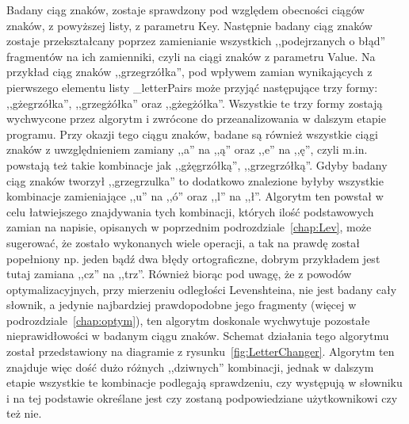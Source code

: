 \lssetdef


Badany ciąg znaków, zostaje sprawdzony pod względem obecności ciągów znaków, z powyższej listy, z parametru Key. Następnie badany ciąg znaków zostaje przekształcany poprzez zamienianie wszystkich ,,podejrzanych o błąd'' fragmentów na ich zamienniki, czyli na ciągi znaków z parametru Value. Na przykład ciąg znaków ,,grzegrzółka'', pod wpływem zamian wynikających z pierwszego elementu listy \_letterPairs może przyjąć następujące trzy formy: ,,gżegrzółka'', ,,grzegżółka'' oraz ,,gżegżółka''. Wszystkie te trzy formy zostają wychwycone przez algorytm i zwrócone do przeanalizowania w dalszym etapie programu. Przy okazji tego ciągu znaków, badane są również wszystkie ciągi znaków z uwzględnieniem zamiany ,,a'' na ,,ą'' oraz ,,e'' na ,,ę'', czyli m.in. powstają też takie kombinacje jak ,,gżęgrzółką'', ,,grzegrzółką''.  Gdyby badany ciąg znaków tworzył ,,grzegrzulka'' to dodatkowo znalezione byłyby wszystkie kombinacje zamieniające ,,u'' na ,,ó'' oraz ,,l'' na ,,ł''. Algorytm ten powstał w celu łatwiejszego znajdywania tych kombinacji, których ilość podstawowych zamian na napisie, opisanych w poprzednim podrozdziale~\ref{chap:Lev}, może sugerować, że zostało wykonanych wiele operacji, a tak na prawdę został popełniony np. jeden bądź dwa błędy ortograficzne, dobrym przykładem jest tutaj zamiana ,,cz'' na ,,trz''. Również biorąc pod uwagę, że z powodów optymalizacyjnych, przy mierzeniu odległości Levenshteina, nie jest badany cały słownik, a jedynie najbardziej prawdopodobne jego fragmenty (więcej w podrozdziale~\ref{chap:optym}), ten algorytm doskonale wychwytuje pozostałe nieprawidłowości w badanym ciągu znaków. Schemat działania tego algorytmu został przedstawiony na diagramie z rysunku~\ref{fig:LetterChanger}. Algorytm ten znajduje więc dość dużo różnych ,,dziwnych'' kombinacji, jednak w dalszym etapie wszystkie te kombinacje podlegają sprawdzeniu, czy występują w słowniku i na tej podstawie określane jest czy zostaną podpowiedziane użytkownikowi czy też nie.

